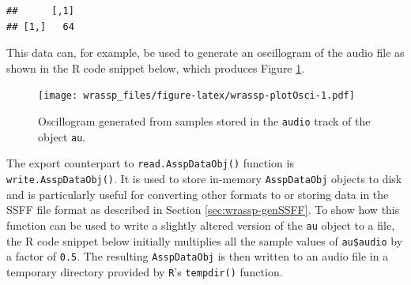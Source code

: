 \documentclass[]{book}
\newenvironment{Shaded}{\begin{snugshade}}{\end{snugshade}}
\newcommand{\CommentTok}[1]{\textcolor[rgb]{0.56,0.35,0.01}{\textit{#1}}}
\newcommand{\DataTypeTok}[1]{\textcolor[rgb]{0.13,0.29,0.53}{#1}}
\newcommand{\DecValTok}[1]{\textcolor[rgb]{0.00,0.00,0.81}{#1}}
\newcommand{\KeywordTok}[1]{\textcolor[rgb]{0.13,0.29,0.53}{\textbf{#1}}}
\newcommand{\NormalTok}[1]{#1}
\newcommand{\OperatorTok}[1]{\textcolor[rgb]{0.81,0.36,0.00}{\textbf{#1}}}
\newcommand{\StringTok}[1]{\textcolor[rgb]{0.31,0.60,0.02}{#1}}
\theoremstyle{definition}
\theoremstyle{definition}
\theoremstyle{definition}
\theoremstyle{remark}
\begin{document}
\begin{Shaded}
\end{Shaded}

\begin{verbatim}
##      [,1]
## [1,]   64
\end{verbatim}

This data can, for example, be used to generate an oscillogram of the
audio file as shown in the R code snippet below, which produces Figure
\ref{fig:wrassp-plotOsci}.

\begin{Shaded}
\end{Shaded}

\begin{figure}
\centering
\texttt{[image: wrassp\_files/figure-latex/wrassp-plotOsci-1.pdf]}
\caption{\label{fig:wrassp-plotOsci}Oscillogram generated from samples
stored in the \texttt{audio} track of the object \texttt{au}.}
\end{figure}

The export counterpart to \texttt{read.AsspDataObj()} function is
\texttt{write.AsspDataObj()}. It is used to store in-memory
\texttt{AsspDataObj} objects to disk and is particularly useful for
converting other formats to or storing data in the SSFF file format as
described in Section \ref{sec:wrassp-genSSFF}. To show how this function
can be used to write a slightly altered version of the \texttt{au}
object to a file, the R code snippet below initially multiplies all the
sample values of \texttt{au\$audio} by a factor of \texttt{0.5}. The
resulting \texttt{AsspDataObj} is then written to an audio file in a
temporary directory provided by \texttt{R}'s \texttt{tempdir()}
function.
\end{document}
